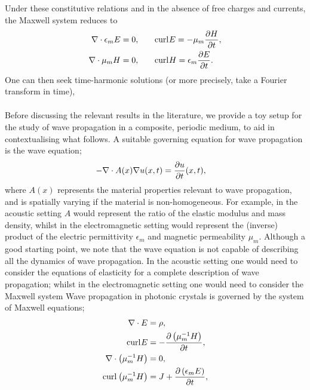 Under these constitutive relations and in the absence of free charges and currents, the Maxwell system reduces to
\begin{subequations} \label{eq:MaxwellSystem}
	\begin{align}
		\nabla\cdot \epsilon_m E = 0, &\qquad
		\mathrm{curl}_{}E = -\mu_m\dfrac{\partial H}{\partial t}, \\
		\nabla\cdot \mu_m H = 0, &\qquad
		 \mathrm{curl}_{}H = \epsilon_m \dfrac{\partial E}{\partial t}.
	\end{align}
\end{subequations}
One can then seek time-harmonic solutions (or more precisely, take a Fourier transform in time),
\begin{align*}
	
\end{align*}

Before discussing the relevant results in the literature, we provide a toy setup for the study of wave propagation in a composite, periodic medium, to aid in contextualising what follows.
A suitable governing equation for wave propagation is the wave equation;
\begin{align*}
	-\nabla\cdot A(x)\nabla u(x,t) &= \dfrac{\partial u}{\partial t}(x,t),
\end{align*}
where $A(x)$ represents the material properties relevant to wave propagation, and is spatially varying if the material is non-homogeneous.
For example, in the acoustic setting $A$ would represent the ratio of the elastic modulus and mass density, whilst in the electromagnetic setting would represent the (inverse) product of the electric permittivity $\epsilon_{m}$ and magnetic permeability $\mu_{m}$.
Although a good starting point, we note that the wave equation is not capable of describing all the dynamics of wave propagation.
In the acoustic setting one would need to consider the equations of elasticity for a complete description of wave propagation; whilst in the electromagnetic setting one would need to consider the Maxwell system
Wave propagation in photonic crystals is governed by the system of Maxwell equations;
\begin{subequations} \label{eq:MaxwellSystem}
	\begin{align}
		\nabla\cdot E &= \rho, \\
		\mathrm{curl}_{}E &= -\dfrac{\partial \left( \mu_{m}^{-1}H \right)}{\partial t}, \\
		\nabla\cdot \left( \mu_{m}^{-1}H \right) &= 0, \\
		 \mathrm{curl}_{}\left( \mu_{m}^{-1}H \right) &= J + \dfrac{\partial \left( \epsilon_{m}E \right)}{\partial t},
	\end{align}
\end{subequations}
